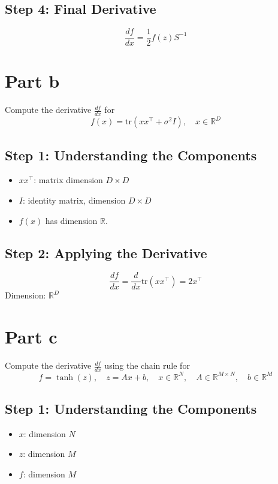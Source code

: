 \documentclass{article}
\begin{document}
\subsection*{Step 4: Final Derivative}
\[
\frac{df}{dx} = \frac{1}{2} f(z) S^{-1}
\]

\section*{Part b}
Compute the derivative \( \frac{df}{dx} \) for
\[
f(x) = \text{tr}(xx^{\top} + \sigma^2 I), \quad x \in \mathbb{R}^D
\]

\subsection*{Step 1: Understanding the Components}
\begin{itemize}
    \item \( xx^{\top} \): matrix dimension \( D \times D \)
    \item \( I \): identity matrix, dimension \( D \times D \)
    \item \( f(x) \) has dimension \( \mathbb{R} \).
\end{itemize}

\subsection*{Step 2: Applying the Derivative}
\[
\frac{df}{dx} = \frac{d}{dx} \text{tr}(xx^{\top}) = 2x^{\top}
\]
Dimension: \( \mathbb{R}^D \)

\section*{Part c}
Compute the derivative \( \frac{df}{dx} \) using the chain rule for
\[
f = \tanh(z), \quad z = Ax + b, \quad x \in \mathbb{R}^N, \quad A \in \mathbb{R}^{M \times N}, \quad b \in \mathbb{R}^M
\]

\subsection*{Step 1: Understanding the Components}
\begin{itemize}
    \item \( x \): dimension \( N \)
    \item \( z \): dimension \( M \)
    \item \( f \): dimension \( M \)
\end{itemize}
\end{document}
